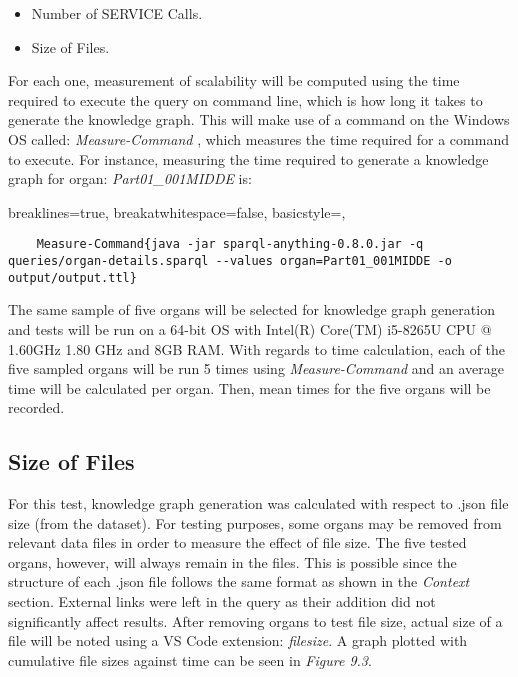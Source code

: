 \vspace{-0.1cm}
\begin{itemize}
\itemsep0cm
    \item Number of SERVICE Calls.
    \vspace{-0.1cm}
    \item Size of Files.
\end{itemize}
\vspace{-0.1cm}

For each one, measurement of scalability will be computed using the time required to execute the query on command line, which is how long it takes to generate the knowledge graph. This will make use of a command on the Windows OS called: \textit{Measure-Command} \cite{measurecommand}, which measures the time required for a command to execute. For instance, measuring the time required to generate a knowledge graph for organ: \textit{Part01\_001MIDDE} is:

\lstset
{
    breaklines=true,
    breakatwhitespace=false,
    basicstyle=\ttfamily,
}
\begin{lstlisting}
    Measure-Command{java -jar sparql-anything-0.8.0.jar -q queries/organ-details.sparql --values organ=Part01_001MIDDE -o output/output.ttl}
\end{lstlisting}

The same sample of five organs will be selected for knowledge graph generation and tests will be run on a 64-bit OS with Intel(R) Core(TM) i5-8265U CPU @ 1.60GHz 1.80 GHz and 8GB RAM. With regards to time calculation, each of the five sampled organs will be run 5 times using \textit{Measure-Command} and an average time will be calculated per organ. Then, mean times for the five organs will be recorded.

\subsection{Size of Files}
\hspace{0.5cm} For this test, knowledge graph generation was calculated with respect to .json file size (from the dataset). For testing purposes, some organs may be removed from relevant data files in order to measure the effect of file size. The five tested organs, however, will always remain in the files. This is possible since the structure of each .json file follows the same format as shown in the \textit{Context} section. External links were left in the query as their addition did not significantly affect results. After removing organs to test file size, actual size of a file will be noted using a VS Code extension: \textit{filesize}. A graph plotted with cumulative file sizes against time can be seen in \textit{Figure 9.3}.

